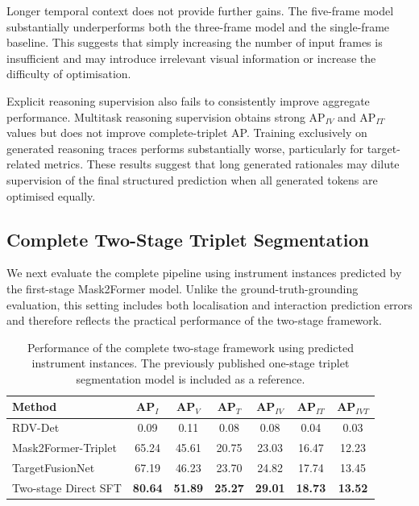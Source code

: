 \documentclass[11pt]{article}
\begin{document}
Longer temporal context does not provide further gains. The five-frame model
substantially underperforms both the three-frame model and the single-frame
baseline. This suggests that simply increasing the number of input frames is
insufficient and may introduce irrelevant visual information or increase the
difficulty of optimisation.

Explicit reasoning supervision also fails to consistently improve aggregate
performance. Multitask reasoning supervision obtains strong AP$_{IV}$ and
AP$_{IT}$ values but does not improve complete-triplet AP. Training exclusively
on generated reasoning traces performs substantially worse, particularly for
target-related metrics. These results suggest that long generated rationales
may dilute supervision of the final structured prediction when all generated
tokens are optimised equally.


\subsection{Complete Two-Stage Triplet Segmentation}

We next evaluate the complete pipeline using instrument instances predicted by
the first-stage Mask2Former model. Unlike the ground-truth-grounding evaluation,
this setting includes both localisation and interaction prediction errors and
therefore reflects the practical performance of the two-stage framework.

\begin{table}[t]
\centering
\caption{Performance of the complete two-stage framework using predicted
instrument instances. The previously published one-stage triplet segmentation
model is included as a reference.}
\label{tab:predicted_grounding_results}
\begin{tabular}{lcccccc}
\toprule
Method
& AP$_I$
& AP$_V$
& AP$_T$
& AP$_{IV}$
& AP$_{IT}$
& AP$_{IVT}$ \\
\midrule

RDV-Det \cite{nwoye2023cholectriplet2022} 
&0.09 &0.11 &0.08 &0.08 &0.04 &0.03 \\

Mask2Former-Triplet \cite{alabi2026grounding} 
&65.24 &45.61 &20.75 &23.03 &16.47 &12.23 \\

TargetFusionNet \cite{alabi2026grounding}
& 67.19 & 46.23 & 23.70 & 24.82 & 17.74 & 13.45 \\

Two-stage Direct SFT
& \textbf{80.64} & \textbf{51.89} & \textbf{25.27}
& \textbf{29.01} & \textbf{18.73} & \textbf{13.52} \\

\bottomrule
\end{tabular}
\end{table}
\end{document}
